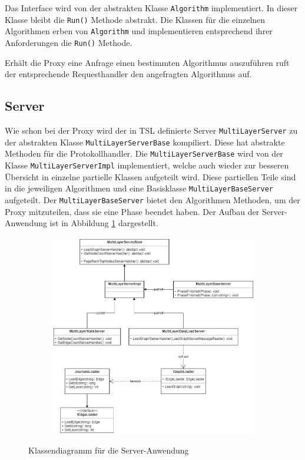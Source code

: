Das Interface wird von der abstrakten Klasse \verb|Algorithm| implementiert. In dieser Klasse bleibt die \verb|Run()| Methode abstrakt.
Die Klassen für die einzelnen Algorithmen erben von \verb|Algorithm| und implementieren entsprechend ihrer Anforderungen die \verb|Run()| Methode.

Erhält die Proxy eine Anfrage einen bestimmten Algorithmus auszuführen ruft der entsprechende Requesthandler den angefragten Algorithmus auf.



\subsection{Server}

Wie schon bei der Proxy wird der in TSL definierte Server \verb|MultiLayerServer| zu der abstrakten Klasse \verb|MultiLayerServerBase| kompiliert. Diese hat abstrakte Methoden für die Protokollhandler.
Die \verb|MultiLayerServerBase| wird von der Klasse \verb|MultiLayerServerImpl| implementiert, welche auch wieder zur besseren Übersicht in einzelne partielle Klassen aufgeteilt wird. Diese partiellen Teile sind in die jeweiligen Algorithmen und eine Basisklasse \verb|MultiLayerBaseServer| aufgeteilt.
Der \verb|MultiLayerBaseServer| bietet den Algorithmen Methoden, um der Proxy mitzuteilen, dass sie eine Phase beendet haben.
Der Aufbau der Server-Anwendung ist in Abbildung \ref{serverClass} dargestellt.


\begin{figure}
  \centering
  \begin{subfigure}[b]{1.0\textwidth}
    \includegraphics[width=1.0\linewidth]{img/Klassendiagramm-Server.png}
  \end{subfigure}
  \caption{Klassendiagramm für die Server-Anwendung}
  \label{serverClass}
\end{figure}


